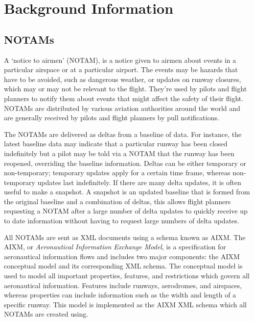 \documentclass[a4paper, 12pt, twoside]{article}
\begin{document}
\section{Background Information}

\subsection{NOTAMs}
\label{sec:bg_notams}
A `notice to airmen' (NOTAM), is a notice given to airmen about events in a particular airspace or at a particular airport. The events may be hazards that have to be avoided, such as dangerous weather, or updates on runway closures, which may or may not be relevant to the flight. They're used by pilots and flight planners to notify them about events that might affect the safety of their flight. NOTAMs are distributed by various aviation authorities around the world and are generally received by pilots and flight planners by pull notifications.

The NOTAMs are delivered as deltas from a baseline of data. For instance, the latest baseline data may indicate that a particular runway has been closed indefinitely but a pilot may be told via a NOTAM that the runway has been reopened, overriding the baseline information. Deltas can be either temporary or non-temporary; temporary updates apply for a certain time frame, whereas non-temporary updates last indefinitely. If there are many delta updates, it is often useful to make a snapshot. A snapshot is an updated baseline that is formed from the original baseline and a combination of deltas, this allows flight planners requesting a NOTAM after a large number of delta updates to quickly receive up to date information without having to request large numbers of delta updates.

All NOTAMs are sent as XML documents using a schema known as AIXM. The AIXM, or \emph{Aeronautical Information Exchange Model}, is a specification for aeronautical information flows and includes two major components: the AIXM conceptual model and its corresponding XML schema. The conceptual model is used to model all important properties, features, and restrictions which govern all aeronautical information. Features include runways, aerodromes, and airspaces, whereas properties can include information such as the width and length of a specific runway. This model is implemented as the AIXM XML schema which all NOTAMs are created using.
\end{document}
